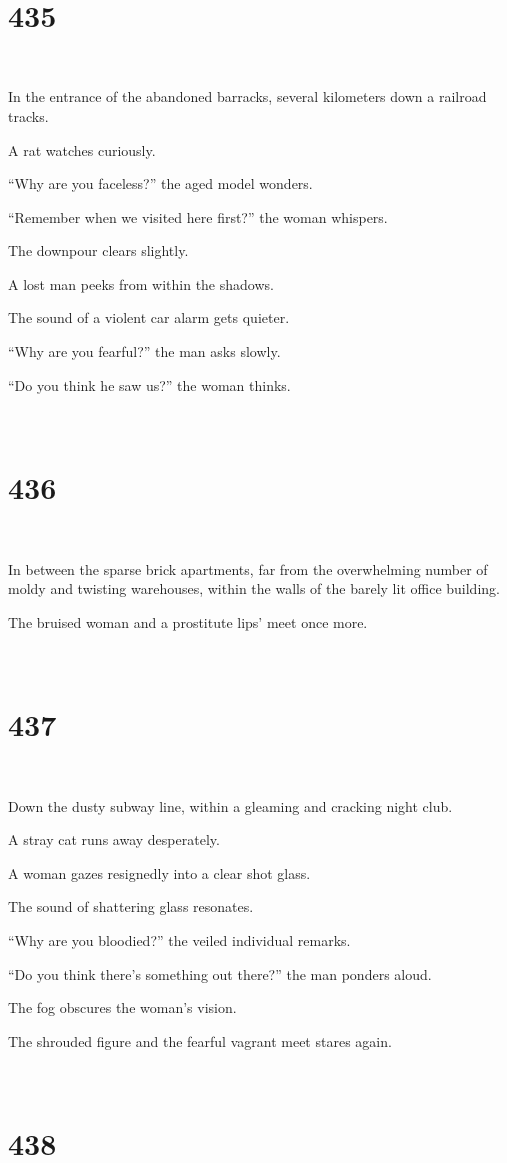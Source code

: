 \documentclass{report}
\begin{document}
~
\chapter*{435}
~

In the entrance of the abandoned barracks, several kilometers down a railroad tracks.

A rat watches curiously.

``Why are you faceless?'' the aged model wonders.

``Remember when we visited here first?'' the woman whispers.

The downpour clears slightly.

A lost man peeks from within the shadows.

The sound of a violent car alarm gets quieter.

``Why are you fearful?'' the man asks slowly.

``Do you think he saw us?'' the woman thinks.

~
\chapter*{436}
~

In between the sparse brick apartments, far from the overwhelming number of moldy and twisting warehouses, within the walls of the barely lit office building.

The bruised woman and a prostitute lips' meet once more.

~
\chapter*{437}
~

Down the dusty subway line, within a gleaming and cracking night club.

A stray cat runs away desperately.

A woman gazes resignedly into a clear shot glass.

The sound of shattering glass resonates.

``Why are you bloodied?'' the veiled individual remarks.

``Do you think there's something out there?'' the man ponders aloud.

The fog obscures the woman's vision.

The shrouded figure and the fearful vagrant meet stares again.

~
\chapter*{438}
~
\end{document}
